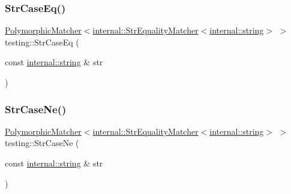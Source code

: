 \mbox{\label{namespacetesting_addbdb8c0902ab09cade24fa6db7c0073}} 
\subsubsection{\texorpdfstring{Str\+Case\+Eq()}{StrCaseEq()}}
{\footnotesize\ttfamily \hyperlink{classtesting_1_1_polymorphic_matcher}{Polymorphic\+Matcher}$<$\hyperlink{classtesting_1_1internal_1_1_str_equality_matcher}{internal\+::\+Str\+Equality\+Matcher}$<$\hyperlink{namespacetesting_1_1internal_a8e8ff5b11e64078831112677156cb111}{internal\+::string}$>$ $>$ testing\+::\+Str\+Case\+Eq (\begin{DoxyParamCaption}\item[{const \hyperlink{namespacetesting_1_1internal_a8e8ff5b11e64078831112677156cb111}{internal\+::string} \&}]{str }\end{DoxyParamCaption})\hspace{0.3cm}{\ttfamily [inline]}}

\mbox{\label{namespacetesting_a9596fd67bdd5df195bc54382f91a1906}} 
\subsubsection{\texorpdfstring{Str\+Case\+Ne()}{StrCaseNe()}}
{\footnotesize\ttfamily \hyperlink{classtesting_1_1_polymorphic_matcher}{Polymorphic\+Matcher}$<$\hyperlink{classtesting_1_1internal_1_1_str_equality_matcher}{internal\+::\+Str\+Equality\+Matcher}$<$\hyperlink{namespacetesting_1_1internal_a8e8ff5b11e64078831112677156cb111}{internal\+::string}$>$ $>$ testing\+::\+Str\+Case\+Ne (\begin{DoxyParamCaption}\item[{const \hyperlink{namespacetesting_1_1internal_a8e8ff5b11e64078831112677156cb111}{internal\+::string} \&}]{str }\end{DoxyParamCaption})\hspace{0.3cm}{\ttfamily [inline]}}

\mbox{\label{namespacetesting_a154de81376ae7d584c6e5a619b45fb09}} 
